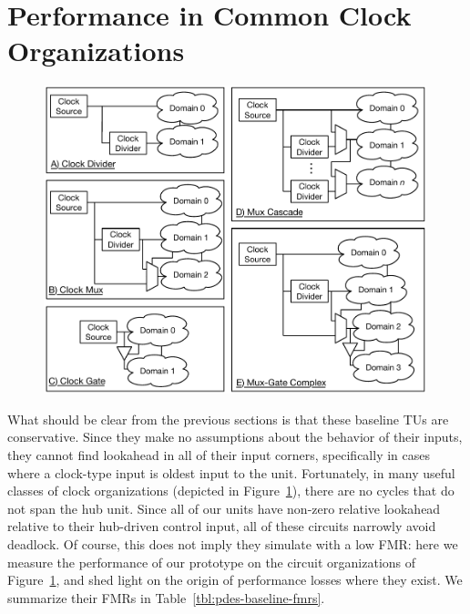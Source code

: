 \section{Performance in Common Clock Organizations}\label{sec:pdes-common-circuit-perf}

\begin{figure}
    \centering
    \includegraphics[width=0.99\textwidth]{figures/clock-organizations.pdf}
    \caption{}
    \label{fig:clock-organizations}
\end{figure}

What should be clear from the previous sections is that these baseline TUs are
conservative. Since they make no assumptions about the behavior of their
inputs, they cannot find lookahead in all of their input corners, specifically
in cases where a clock-type input is oldest input to the unit. Fortunately, in
many useful classes of clock organizations (depicted in
Figure~\ref{fig:clock-organizations}), there are no cycles that do not span the
hub unit. Since all of our units have non-zero relative lookahead relative to
their hub-driven control input, all of these circuits narrowly avoid deadlock.
Of course, this does not imply they simulate with a low FMR: here we measure
the performance of our prototype on the circuit organizations of
Figure~\ref{fig:clock-organizations}, and shed light on the origin of
performance losses where they exist. We summarize their FMRs in
Table~\ref{tbl:pdes-baseline-fmrs}.

